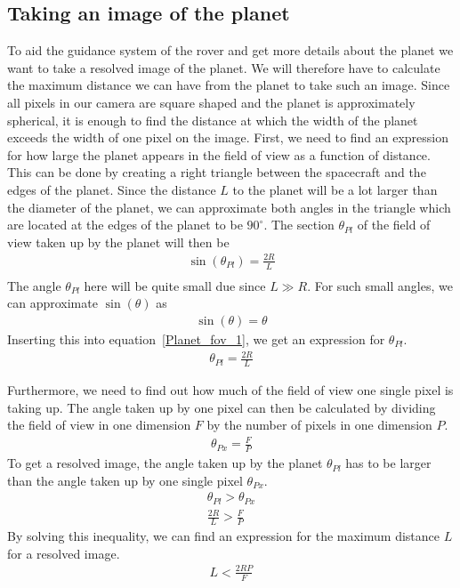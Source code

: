 \documentclass[reprint,english,notitlepage]{revtex4-2}
\begin{document}
\subsection{Taking an image of the planet}\label{subsec:taking-an-image-of-the-planet}
    To aid the guidance system of the rover and get more details about the planet we want to take a resolved image of the planet.
	We will therefore have to calculate the maximum distance we can have from the planet to take such an image.
	Since all pixels in our camera are square shaped and the planet is approximately spherical, it is enough to find the distance at which the width of the planet exceeds the width of one pixel on the image.
	First, we need to find an expression for how large the planet appears in the field of view as a function of distance.
	This can be done by creating a right triangle between the spacecraft and the edges of the planet.
	Since the distance $L$ to the planet will be a lot larger than the diameter of the planet, we can approximate both angles in the triangle which are located at the edges of the planet to be $90^{\circ}$.
	The section $\theta_{Pl}$ of the field of view taken up by the planet will then be
	\begin{align}
	    \sin\left(\theta_{Pl}\right) = \frac{2R}{L} \label{Planet_fov_1}\\
	\end{align}
	The angle $\theta_{Pl}$ here will be quite small due since $L \gg R$.
	For such small angles, we can approximate $\sin\left(\theta\right)$ as
	\begin{align*}
	    \sin\left(\theta\right) = \theta
	\end{align*}
	Inserting this into equation~\eqref{Planet_fov_1}, we get an expression for $\theta_{Pl}$.
	\begin{align*}
	    \theta_{Pl} = \frac{2R}{L}
	\end{align*}

	Furthermore, we need to find out how much of the field of view one single pixel is taking up.
	The angle taken up by one pixel can then be calculated by dividing the field of view in one dimension $F$ by the number of pixels in one dimension $P$.
	\begin{align*}
	    \theta_{Px} = \frac{F}{P}
	\end{align*}
	To get a resolved image, the angle taken up by the planet $\theta_{Pl}$ has to be larger than the angle taken up by one single pixel $\theta_{Px}$.
	\begin{align*}
	    \theta_{Pl} > \theta_{Px}\\
		\frac{2R}{L} > \frac{F}{P}
	\end{align*}
	By solving this inequality, we can find an expression for the maximum distance $L$ for a resolved image.
	\begin{align}
	    L < \frac{2RP}{F} \label{Image_Dist}
	\end{align}
\end{document}
